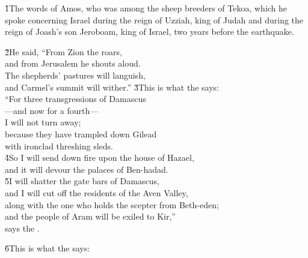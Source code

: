 


\v{1}The words of Amos, who was among the sheep breeders of Tekoa, which he spoke concerning Israel during the reign of Uzziah, king of Judah and during the reign of Joash's son Jeroboam, king of Israel, two years before the earthquake.

\begin{poetry}
\poeml \v{2}He said, ``From Zion the  roars, \\
\poemll    and from Jerusalem he shouts aloud. \\
\poeml The shepherds' pastures will languish, \\
\poemll    and Carmel's summit will wither.''
\poeml \v{3}This is what the  says: \\
\poeml ``For three transgressions of Damascus \\
\poemll    ---and now for a fourth--- \\
\poemlll       I will not turn away; \\
\poeml because they have trampled down Gilead \\
\poemll    with ironclad threshing sleds. \\
\poeml \v{4}So I will send down fire upon the house of Hazael, \\
\poemll    and it will devour the palaces of Ben-hadad. \\
\poeml \v{5}I will shatter the gate bars of Damascus, \\
\poemll    and I will cut off the residents of the Aven Valley, \\
\poeml along with the one who holds the scepter from Beth-eden; \\
\poemll    and the people of Aram will be exiled to Kir,'' \\
\poemlll       says the .
\end{poetry}

\v{6}This is what the  says:

